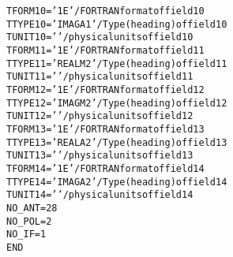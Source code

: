 \documentclass[twoside]{article}
\begin{document}
\begin{alltt}
TFORM10 = '1E      '           / FORTRAN format of field 10
TTYPE10 = 'IMAG A1         '   / Type (heading) of field 10
TUNIT10 = '        '           / physical units of field 10
TFORM11 = '1E      '           / FORTRAN format of field 11
TTYPE11 = 'REAL M2         '   / Type (heading) of field 11
TUNIT11 = '        '           / physical units of field 11
TFORM12 = '1E      '           / FORTRAN format of field 12
TTYPE12 = 'IMAG M2         '   / Type (heading) of field 12
TUNIT12 = '        '           / physical units of field 12
TFORM13 = '1E      '           / FORTRAN format of field 13
TTYPE13 = 'REAL A2         '   / Type (heading) of field 13
TUNIT13 = '        '           / physical units of field 13
TFORM14 = '1E      '           / FORTRAN format of field 14
TTYPE14 = 'IMAG A2         '   / Type (heading) of field 14
TUNIT14 = '        '           / physical units of field 14
NO_ANT  =           28
NO_POL  =            2
NO_IF   =            1
END
\end{alltt}
\end{document}
